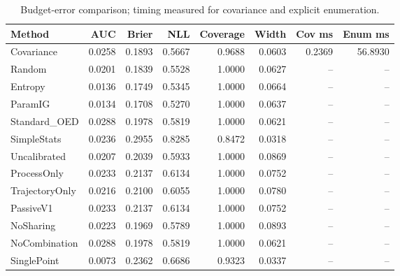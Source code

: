 \begin{table}[t]
\caption{Budget-error comparison; timing measured for covariance and explicit enumeration.}
\label{tab:experiment2}
\begin{tabular}{lrrrrrrr}
\toprule
Method & AUC & Brier & NLL & Coverage & Width & Cov ms & Enum ms \\
\midrule
Covariance & 0.0258 & 0.1893 & 0.5667 & 0.9688 & 0.0603 & 0.2369 & 56.8930 \\
Random & 0.0201 & 0.1839 & 0.5528 & 1.0000 & 0.0627 & -- & -- \\
Entropy & 0.0136 & 0.1749 & 0.5345 & 1.0000 & 0.0664 & -- & -- \\
ParamIG & 0.0134 & 0.1708 & 0.5270 & 1.0000 & 0.0637 & -- & -- \\
Standard\_OED & 0.0288 & 0.1978 & 0.5819 & 1.0000 & 0.0621 & -- & -- \\
SimpleStats & 0.0236 & 0.2955 & 0.8285 & 0.8472 & 0.0318 & -- & -- \\
Uncalibrated & 0.0207 & 0.2039 & 0.5933 & 1.0000 & 0.0869 & -- & -- \\
ProcessOnly & 0.0233 & 0.2137 & 0.6134 & 1.0000 & 0.0752 & -- & -- \\
TrajectoryOnly & 0.0216 & 0.2100 & 0.6055 & 1.0000 & 0.0780 & -- & -- \\
PassiveV1 & 0.0233 & 0.2137 & 0.6134 & 1.0000 & 0.0752 & -- & -- \\
NoSharing & 0.0223 & 0.1969 & 0.5789 & 1.0000 & 0.0893 & -- & -- \\
NoCombination & 0.0288 & 0.1978 & 0.5819 & 1.0000 & 0.0621 & -- & -- \\
SinglePoint & 0.0073 & 0.2362 & 0.6686 & 0.9323 & 0.0337 & -- & -- \\
\bottomrule
\end{tabular}
\end{table}
